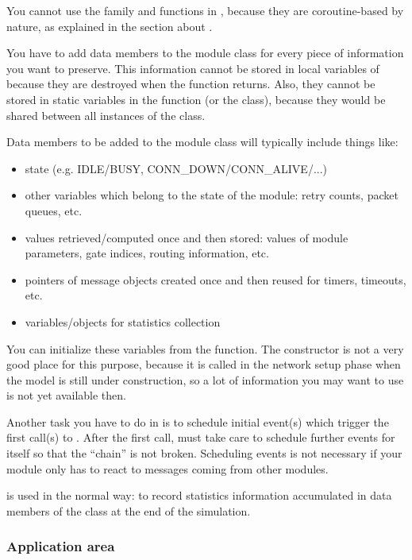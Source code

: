 You cannot use the  family and
 functions in , because they are
coroutine-based by nature, as explained in the section about
.

You have to add data members to the module class for every piece
of information you want to preserve. This information cannot
be stored in local variables of  because they
are destroyed when the function returns. Also, they cannot be
stored in static variables in the function (or the class), because
they would be shared between all instances of the class.


Data members to be added to the module class will typically include
things like:

\begin{itemize}
  \item{state (e.g. IDLE/BUSY, CONN\_DOWN/CONN\_ALIVE/...)}
  \item{other variables which belong to the state of the module: retry
    counts, packet queues, etc.}
  \item{values retrieved/computed once and then stored: values of module
    parameters, gate indices, routing information, etc.}
  \item{pointers of message objects created once and then reused for
    timers, timeouts, etc.}
  \item{variables/objects for statistics collection}
\end{itemize}

You can initialize these variables from the 
function.  The constructor is not a very good place
for this purpose, because it is called in the network setup phase when
the model is still under construction, so a lot of information you may
want to use is not yet available then.

Another task you have to do in  is to schedule
initial event(s) which trigger the first call(s)
to .  After the first call,
 must take care to schedule further events for
itself so that the ``chain'' is not broken. Scheduling events is not
necessary if your module only has to react to messages coming from
other modules.

 is used in the normal way: to record statistics information
accumulated in data members of the class at the end of the simulation.


\subsubsection{Application area}



